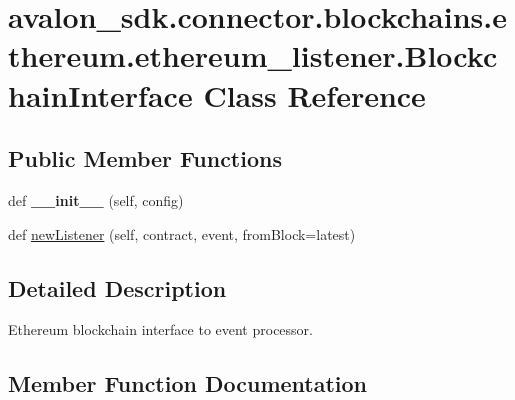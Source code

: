 \hypertarget{classavalon__sdk_1_1connector_1_1blockchains_1_1ethereum_1_1ethereum__listener_1_1BlockchainInterface}{}\section{avalon\+\_\+sdk.\+connector.\+blockchains.\+ethereum.\+ethereum\+\_\+listener.\+Blockchain\+Interface Class Reference}
\label{classavalon__sdk_1_1connector_1_1blockchains_1_1ethereum_1_1ethereum__listener_1_1BlockchainInterface}
\subsection*{Public Member Functions}
\begin{DoxyCompactItemize}
\item 
\mbox{\label{classavalon__sdk_1_1connector_1_1blockchains_1_1ethereum_1_1ethereum__listener_1_1BlockchainInterface_a48cf94dcfa922b192314b98f2ce0c604}} 
def {\bfseries \+\_\+\+\_\+init\+\_\+\+\_\+} (self, config)
\item 
def \hyperlink{classavalon__sdk_1_1connector_1_1blockchains_1_1ethereum_1_1ethereum__listener_1_1BlockchainInterface_aad5fa4f3a18467435e0c25f2d34aad31}{new\+Listener} (self, contract, event, from\+Block=\textquotesingle{}latest\textquotesingle{})
\end{DoxyCompactItemize}


\subsection{Detailed Description}
\begin{DoxyVerb}Ethereum blockchain interface to event processor.\end{DoxyVerb}
 

\subsection{Member Function Documentation}
\mbox{\label{classavalon__sdk_1_1connector_1_1blockchains_1_1ethereum_1_1ethereum__listener_1_1BlockchainInterface_aad5fa4f3a18467435e0c25f2d34aad31}} 
